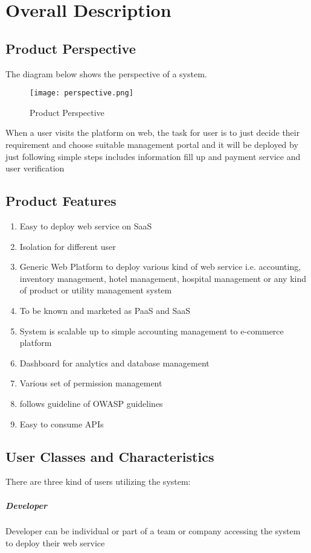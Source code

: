 \documentclass{scrreprt}
\begin{document}
\chapter{Overall Description}

\section{Product Perspective}
\label{product_perspective}
The diagram below shows the perspective of a system.
\begin{figure}[H]
\centering	
\texttt{[image: perspective.png]}
\caption{Product Perspective}
\end{figure}
When a user visits the platform on web, the task for user is to just decide their requirement and choose suitable management portal and it will be deployed by just following simple steps includes information fill up and payment service and user verification

\section{Product Features}
\begin{enumerate}
	\item Easy to deploy web service on SaaS
	\item Isolation for different user
	\item Generic Web Platform to deploy various kind of web service i.e. accounting, inventory management, hotel management, hospital management or any kind of product or utility management system
	\item To be known and marketed as PaaS and SaaS
	\item System is scalable up to simple accounting management to e-commerce platform
	\item Dashboard for analytics and database management
	\item Various set of permission management
	\item follows guideline of OWASP guidelines
	\item Easy to consume APIs
\end{enumerate}

\section{User Classes and Characteristics}
There are three kind of users utilizing the system:
\paragraph[developerRole]{Developer} Developer can be individual or part of a team or company accessing the system to deploy their web service
\end{document}

